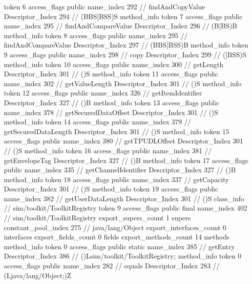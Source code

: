 {{{{{					token	6
					access_flags	public
					name_index	292		// findAndCopyValue
					Descriptor_Index	294		// (BBS[BSS)S
				}
				method_info {
					token	7
					access_flags	public
					name_index	295		// findAndCompareValue
					Descriptor_Index	296		// (B[BS)B
				}
				method_info {
					token	8
					access_flags	public
					name_index	295		// findAndCompareValue
					Descriptor_Index	297		// (BBS[BSS)B
				}
				method_info {
					token	9
					access_flags	public
					name_index	298		// copy
					Descriptor_Index	299		// ([BSS)S
				}
				method_info {
					token	10
					access_flags	public
					name_index	300		// getLength
					Descriptor_Index	301		// ()S
				}
				method_info {
					token	11
					access_flags	public
					name_index	302		// getValueLength
					Descriptor_Index	301		// ()S
				}
				method_info {
					token	12
					access_flags	public
					name_index	326		// getItemIdentifier
					Descriptor_Index	327		// ()B
				}
				method_info {
					token	13
					access_flags	public
					name_index	378		// getSecuredDataOffset
					Descriptor_Index	301		// ()S
				}
				method_info {
					token	14
					access_flags	public
					name_index	379		// getSecuredDataLength
					Descriptor_Index	301		// ()S
				}
				method_info {
					token	15
					access_flags	public
					name_index	380		// getTPUDLOffset
					Descriptor_Index	301		// ()S
				}
				method_info {
					token	16
					access_flags	public
					name_index	381		// getEnvelopeTag
					Descriptor_Index	327		// ()B
				}
				method_info {
					token	17
					access_flags	public
					name_index	335		// getChannelIdentifier
					Descriptor_Index	327		// ()B
				}
				method_info {
					token	18
					access_flags	public
					name_index	337		// getCapacity
					Descriptor_Index	301		// ()S
				}
				method_info {
					token	19
					access_flags	public
					name_index	382		// getUserDataLength
					Descriptor_Index	301		// ()S
				}
			}
		}
		class_info {		// sim/toolkit/ToolkitRegistry
			token	9
			access_flags	public final
			name_index	402		// sim/toolkit/ToolkitRegistry
			export_supers_count	1
			supers {
				constant_pool_index	275		// java/lang/Object
			}
			export_interfaces_count	0
			interfaces {
			}
			export_fields_count	0
			fields {
			}
			export_methods_count	14
			methods {
				method_info {
					token	0
					access_flags	public static
					name_index	385		// getEntry
					Descriptor_Index	386		// ()Lsim/toolkit/ToolkitRegistry;
				}
				method_info {
					token	0
					access_flags	public
					name_index	282		// equals
					Descriptor_Index	283		// (Ljava/lang/Object;)Z
				}
}}}}
